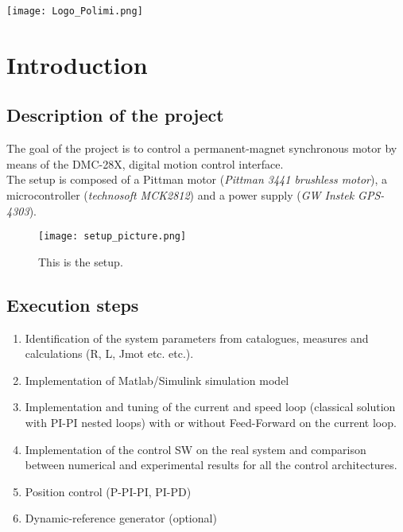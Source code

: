 \documentclass[12pt]{article}
\begin{document}
\begin{titlepage}

\texttt{[image: Logo\_Polimi.png]}
 

\vfill %

\end{titlepage}

\tableofcontents


\section{Introduction}
\subsection{Description of the project}
The goal of the project is to control a permanent-magnet synchronous motor by means of the DMC-28X, digital motion control interface.\\
The setup is composed of a Pittman motor (\textit{Pittman 3441 brushless motor}), a microcontroller (\textit{technosoft MCK2812}) and a power supply (\textit{GW Instek GPS-4303}).\\[0.3cm]

\begin{figure}[h]
\centering
\texttt{[image: setup\_picture.png]}
\caption{\label{fig:setup}This is the setup.}
\end{figure}

\subsection{Execution steps}

\begin{enumerate}
\item Identification of the system parameters from catalogues,
measures and calculations (R, L, Jmot etc. etc.).
\item Implementation of Matlab/Simulink simulation model
\item Implementation and tuning of the current and speed loop
(classical solution with PI-PI nested loops) with or without
Feed-Forward on the current loop.
\item Implementation of the control SW on the real system and
comparison between numerical and experimental results for
all the control architectures.
\item Position control (P-PI-PI, PI-PD)
\item Dynamic-reference generator (optional)
\end{enumerate}
\end{document}
